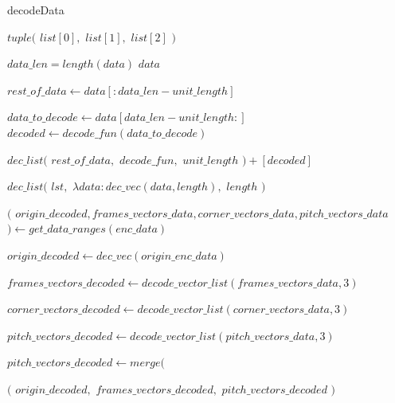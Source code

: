 \documentclass[
11pt,
twoside
]{report}
\begin{document}
\begin{algorithm}
\begin{algorithmic}


\caption{decodeData}\label{alg:cap}


    \Return $tuple($
        \State \indent $list[0],$
        \State \indent $list[1],$
        \State \indent $list[2]$
    \State $)$
\EndProcedure

    \State
    $data\_len = length(data)$
        \Return $data$
    \EndIf

    \State $rest\_of\_data \gets data[:data\_len - unit\_length]$

    \State $data\_to\_decode \gets data[data\_len - unit\_length:]$
    \State $decoded \gets decode\_fun(data\_to\_decode)$

    \Return $dec\_list($
            \State \indent $rest\_of\_data,$
            \State \indent $decode\_fun,$
            \State \indent $unit\_length$
    \State $) + [decoded]$
\EndProcedure


    \Return $dec\_list($
        \State \indent $lst,$
        \State \indent $\lambda data: dec\_vec(data, length),$
        \State \indent $length$
    \State $)$
\EndProcedure




    \State $($
    \State \indent $origin\_decoded, frames\_vectors\_data, corner\_vectors\_data, pitch\_vectors\_data$
    \State $) \gets get\_data\_ranges(enc\_data)$

    \State $origin\_decoded \gets dec\_vec(origin\_enc\_data)$

    \State $frames\_vectors\_decoded \gets decode\_vector\_list(frames\_vectors\_data, 3)$

    \State $corner\_vectors\_decoded \gets decode\_vector\_list(corner\_vectors\_data, 3)$

    \State $pitch\_vectors\_decoded \gets decode\_vector\_list(pitch\_vectors\_data, 3)$

    \State $pitch\_vectors\_decoded \gets merge($

    \Return $($
        \State \indent $origin\_decoded,$
        \State \indent $frames\_vectors\_decoded,$
        \State \indent $pitch\_vectors\_decoded$
    \State $)$

\EndProcedure



\end{algorithmic}
\end{algorithm}
\end{document}
